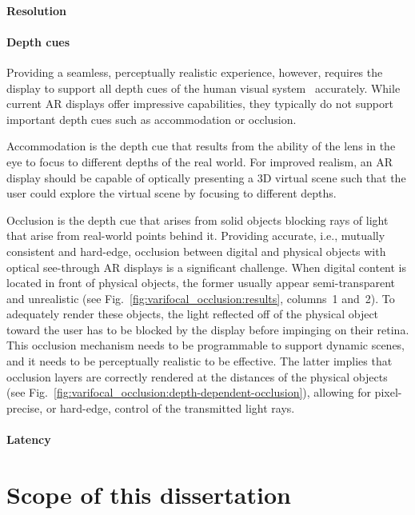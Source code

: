 \paragraph{Resolution}

\paragraph{Depth cues}
Providing a seamless, perceptually realistic experience, however, requires the display to support all depth cues of the human visual system~\cite{Palmer:1999,Howard:2002} accurately. 
While current AR displays offer impressive capabilities, they typically do not support important depth cues such as accommodation or occlusion.

Accommodation is the depth cue that results from the ability of the lens in the eye to focus to different depths of the real world. For improved realism, an AR display should be capable of optically presenting a 3D virtual scene such that the user could explore the virtual scene by focusing to different depths.

Occlusion is the depth cue that arises from solid objects blocking rays of light that arise from real-world points behind it. Providing accurate, i.e., mutually consistent and hard-edge, occlusion between digital and physical objects with optical see-through AR displays is a significant challenge. When digital content is located in front of physical objects, the former usually appear semi-transparent and unrealistic (see Fig.~\ref{fig:varifocal_occlusion:results}, columns~1 and~2). To adequately render these objects, the light reflected off of the physical object toward the user has to be blocked by the display before impinging on their retina. This occlusion mechanism needs to be programmable to support dynamic scenes, and it needs to be perceptually realistic to be effective. The latter implies that occlusion layers are correctly rendered at the distances of the physical objects (see Fig.~\ref{fig:varifocal_occlusion:depth-dependent-occlusion}), allowing for pixel-precise, or hard-edge, control of the transmitted light rays.

\paragraph{Latency}

\section{Scope of this dissertation}

